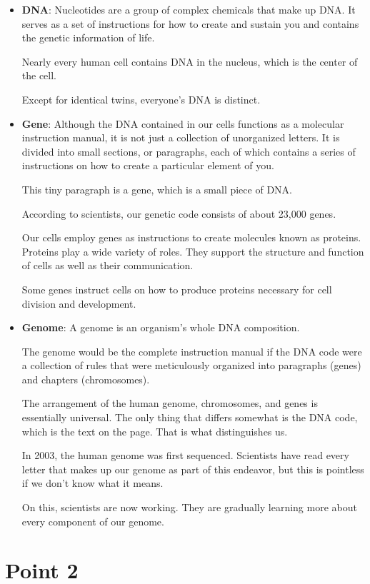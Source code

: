\documentclass{article}
\begin{document}
\begin{itemize}
    \item \textbf{DNA}: Nucleotides are a group of complex chemicals that make up DNA. It serves as a set of instructions for how to create and sustain you and contains the genetic information of life. 

    Nearly every human cell contains DNA in the nucleus, which is the center of the cell. 
    
    Except for identical twins, everyone's DNA is distinct.
    \item  \textbf{Gene}: Although the DNA contained in our cells functions as a molecular instruction manual, it is not just a collection of unorganized letters. It is divided into small sections, or paragraphs, each of which contains a series of instructions on how to create a particular element of you. 

    This tiny paragraph is a gene, which is a small piece of DNA. 
    
    According to scientists, our genetic code consists of about 23,000 genes. 
    
    Our cells employ genes as instructions to create molecules known as proteins. Proteins play a wide variety of roles. They support the structure and function of cells as well as their communication. 
    
    Some genes instruct cells on how to produce proteins necessary for cell division and development.
    \item \textbf{Genome}: A genome is an organism's whole DNA composition. 

    The genome would be the complete instruction manual if the DNA code were a collection of rules that were meticulously organized into paragraphs (genes) and chapters (chromosomes). 
    
    The arrangement of the human genome, chromosomes, and genes is essentially universal. The only thing that differs somewhat is the DNA code, which is the text on the page. That is what distinguishes us. 
    
    In 2003, the human genome was first sequenced. Scientists have read every letter that makes up our genome as part of this endeavor, but this is pointless if we don't know what it means. 
    
    On this, scientists are now working. They are gradually learning more about every component of our genome.
\end{itemize}


\section{Point 2}
\end{document}
